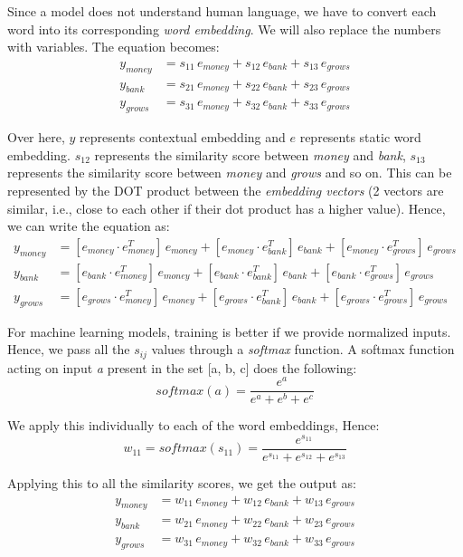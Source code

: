 Since a model does not understand human language, we have to convert each word into its corresponding \textit{word embedding}. We will also replace the numbers with variables. The equation becomes:
\begin{align}
    y_{money} &= s_{11}\,e_{money} + s_{12}\,e_{bank} + s_{13}\,e_{grows} \\
    y_{bank} &= s_{21}\,e_{money} + s_{22}\,e_{bank} + s_{23}\,e_{grows} \\
    y_{grows} &= s_{31}\,e_{money} + s_{32}\,e_{bank} + s_{33}\,e_{grows}
\end{align}

Over here, $y$ represents contextual embedding and $e$ represents static word embedding. $s_{12}$ represents the similarity score between \textit{money} and \textit{bank}, $s_{13}$ represents the similarity score between \textit{money} and \textit{grows} and so on. This can be represented by the DOT product between the \textit{embedding vectors} (2 vectors are similar, i.e., close to each other if their dot product has a higher value). Hence, we can write the equation as:
\begin{align}
    y_{money} &= [e_{money} \cdot e_{money}^T]\,e_{money}
              + [e_{money} \cdot e_{bank}^T]\,e_{bank}
              + [e_{money} \cdot e_{grows}^T]\,e_{grows} \\
    y_{bank} &= [e_{bank} \cdot e_{money}^T]\,e_{money}
             + [e_{bank} \cdot e_{bank}^T]\,e_{bank}
             + [e_{bank} \cdot e_{grows}^T]\,e_{grows} \\
    y_{grows} &= [e_{grows} \cdot e_{money}^T]\,e_{money}
              + [e_{grows} \cdot e_{bank}^T]\,e_{bank}
              + [e_{grows} \cdot e_{grows}^T]\,e_{grows}
\end{align}

For machine learning models, training is better if we provide normalized inputs. Hence, we pass all the $s_{ij}$ values through a \textit{softmax} function. A softmax function acting on input \textit{a} present in the set [a, b, c] does the following:
$$softmax(a) = \frac{e^a}{e^a + e^b + e^c}$$

We apply this individually to each of the word embeddings, Hence:
$$w_{11} = softmax(s_{11}) = \frac{e^{s_{11}}}{e^{s_{11}} + e^{s_{12}} + e^{s_{13}}}$$

Applying this to all the similarity scores, we get the output as:
\begin{align}
    y_{money} &= w_{11}\,e_{money} + w_{12}\,e_{bank} + w_{13}\,e_{grows} \\
    y_{bank} &= w_{21}\,e_{money} + w_{22}\,e_{bank} + w_{23}\,e_{grows} \\
    y_{grows} &= w_{31}\,e_{money} + w_{32}\,e_{bank} + w_{33}\,e_{grows}
\end{align}

